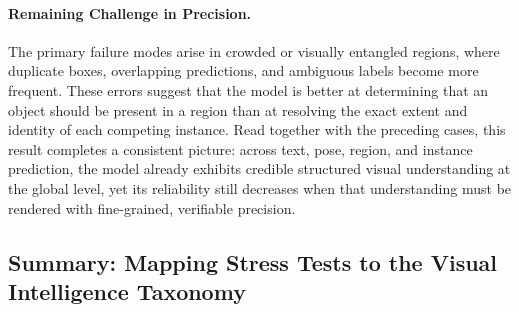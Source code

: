 \documentclass{llmxive}
\begin{document}
\paragraph{Remaining Challenge in Precision.}
The primary failure modes arise in crowded or visually entangled regions, where duplicate boxes, overlapping predictions, and ambiguous labels become more frequent. These errors suggest that the model is better at determining that an object should be present in a region than at resolving the exact extent and identity of each competing instance. Read together with the preceding cases, this result completes a consistent picture: across text, pose, region, and instance prediction, the model already exhibits credible structured visual understanding at the global level, yet its reliability still decreases when that understanding must be rendered with fine-grained, verifiable precision.

\subsection{Summary: Mapping Stress Tests to the Visual Intelligence Taxonomy}
\end{document}

